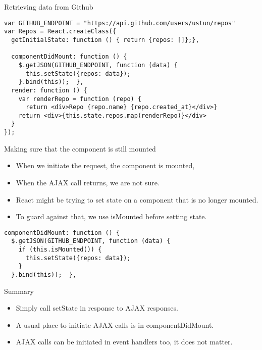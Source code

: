 \documentclass[presentation]{beamer}
\begin{document}
\begin{frame}[fragile,label={sec:orgheadline5}]{Retrieving data from Github}
 \begin{verbatim}
var GITHUB_ENDPOINT = "https://api.github.com/users/ustun/repos"
var Repos = React.createClass({
  getInitialState: function () { return {repos: []};},

  componentDidMount: function () {
    $.getJSON(GITHUB_ENDPOINT, function (data) {
      this.setState({repos: data});
    }.bind(this));  },
  render: function () {
    var renderRepo = function (repo) {
      return <div>Repo {repo.name} {repo.created_at}</div>}
    return <div>{this.state.repos.map(renderRepo)}</div>
  }
});
\end{verbatim}
\end{frame}

\begin{frame}[fragile,label={sec:orgheadline6}]{Making sure that the component is still mounted}
 \begin{itemize}
\item When we initiate the request, the component is mounted,
\item When the AJAX call returns, we are not sure.
\item React might be trying to set state on a component that is no longer
mounted.
\item To guard against that, we use isMounted before setting state.
\end{itemize}

\begin{verbatim}
componentDidMount: function () {
  $.getJSON(GITHUB_ENDPOINT, function (data) {
    if (this.isMounted()) {
      this.setState({repos: data});
    }
  }.bind(this));  },
\end{verbatim}
\end{frame}

\begin{frame}[label={sec:orgheadline7}]{Summary}
\begin{itemize}
\item Simply call setState in response to AJAX responses.
\item A usual place to initiate AJAX calls is in componentDidMount.
\item AJAX calls can be initiated in event handlers too, it does not matter.
\end{itemize}
\end{frame}
\end{document}
